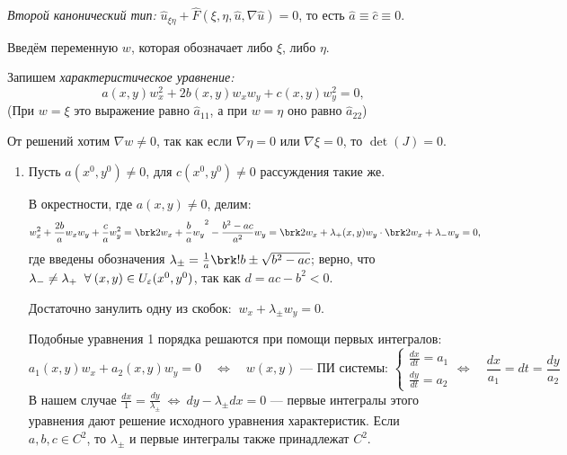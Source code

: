\documentclass[../main.tex]{subfiles}
\begin{document}
\begin{definition}
\textit{Второй канонический тип:} 
$\hat{u}_{\xi\eta} + \hat{F}(\xi,\eta,\hat{u},\nabla\hat{u}) = 0$, 
то есть $\hat{a} \equiv \hat{c} \equiv 0$.
\end{definition}

Введём переменную $w$, которая обозначает либо $\xi$, либо $\eta$.

Запишем \textit{характеристическое уравнение:}
$$
a(x,y)w_x^2 + 2b(x,y) w_x w_y + c(x,y)w_y^2 = 0, 
$$
(При  $w = \xi$ это выражение равно $\hat{a}_{11}$, 
а при $w = \eta$ оно равно $\hat{a}_{22}$)

От решений хотим $\nabla w \neq 0$, 
так как если $\nabla \eta = 0$ или $\nabla \xi = 0$, 
то $\det(J) = 0$.
%
\begin{enumerate}[label=\asbuk*),ref=\asbuk*]

\item Пусть $a(x^0, y^0) \neq 0$,
для $c(x^0, y^0) \neq 0$ рассуждения такие же.

В окрестности, где $a(x,y) \neq 0$, делим:
$$
w_x^2 + \frac{2b}{a} w_x w_y + \frac{c}{a}w_y^2 
= \brk2{ w_x + \dfrac{b}{a}w_y }^2 - \frac{b^2-ac}{a^2} w_y 
= \brk2{ w_x + \lambda_{+}(x, y)w_y } \cdot 
  \brk2{ w_x + \lambda_{-}w_y } = 0,
$$
где введены обозначения 
$\lambda_\pm = \frac{1}{a} \brk!{b \pm \sqrt{b^2 - ac}}$;
верно, что $\lambda_- \neq \lambda_+
\;\;\forall\: (x, y) \in U_{\varepsilon}(x^0, y^0)$, 
так как $d = ac - b^2 < 0$.

Достаточно занулить одну из скобок: $\ w_x + \lambda_\pm w_y = 0.$

Подобные уравнения 1 порядка решаются при помощи первых интегралов:
$$
a_1(x,y) w_x + a_2(x,y) w_y = 0 
\quad\Leftrightarrow\quad
w(x,y) \text{ --- ПИ системы: }
\begin{cases}
  \frac{dx}{dt} = a_1 \\
  \frac{dy}{dt} = a_2
\end{cases}
\Leftrightarrow\quad
\frac{dx}{a_1} = dt = \frac{dy}{a_2}
$$
В нашем случае 
$\frac{dx}{1} = \frac{dy}{\lambda_\pm} 
\ \Leftrightarrow\ 
dy - \lambda_\pm dx = 0 $
--- первые интегралы этого уравнения дают решение исходного уравнения характеристик.
Если $a,b,c \in C^2$, то $\lambda_\pm$ и первые интегралы также принадлежат $C^2$.


\end{enumerate}
\end{document}
